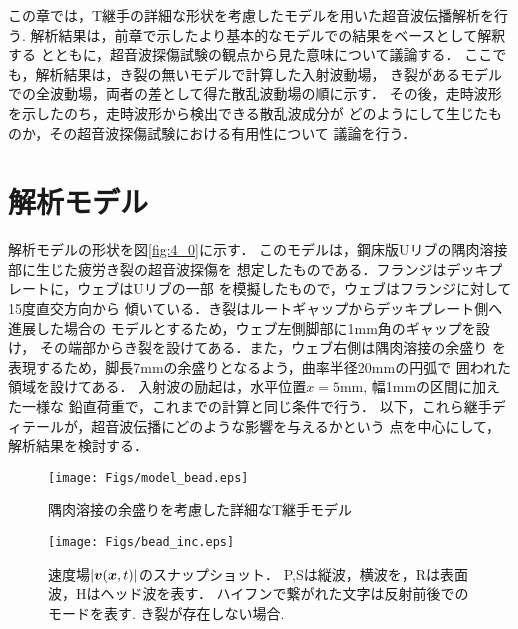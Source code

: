 この章では，T継手の詳細な形状を考慮したモデルを用いた超音波伝播解析を行う.
解析結果は，前章で示したより基本的なモデルでの結果をベースとして解釈する
とともに，超音波探傷試験の観点から見た意味について議論する．
ここでも，解析結果は，き裂の無いモデルで計算した入射波動場，
き裂があるモデルでの全波動場，両者の差として得た散乱波動場の順に示す．
その後，走時波形を示したのち，走時波形から検出できる散乱波成分が
どのようにして生じたものか，その超音波探傷試験における有用性について
議論を行う．
\section{解析モデル}
解析モデルの形状を図\ref{fig:4_0}に示す．
このモデルは，鋼床版Uリブの隅肉溶接部に生じた疲労き裂の超音波探傷を
想定したものである．フランジはデッキプレートに，ウェブはUリブの一部
を模擬したもので，ウェブはフランジに対して15度直交方向から
傾いている．き裂はルートギャップからデッキプレート側へ進展した場合の
モデルとするため，ウェブ左側脚部に1mm角のギャップを設け，
その端部からき裂を設けてある．また，ウェブ右側は隅肉溶接の余盛り
を表現するため，脚長7mmの余盛りとなるよう，曲率半径20mmの円弧で
囲われた領域を設けてある．
入射波の励起は，水平位置$x=5$mm, 幅1mmの区間に加えた一様な
鉛直荷重で，これまでの計算と同じ条件で行う．
以下，これら継手ディテールが，超音波伝播にどのような影響を与えるかという
点を中心にして，解析結果を検討する．
\begin{figure}[h]
	\begin{center}
	\texttt{[image: Figs/model\_bead.eps]} 
	\end{center}
	\caption{
		隅肉溶接の余盛りを考慮した詳細なT継手モデル
	} 
	\label{fig:fig4_0}
\end{figure}
\begin{figure}[h]
	\begin{center}
	\texttt{[image: Figs/bead\_inc.eps]} 
	\end{center}
	\caption{
		速度場$|\mbox{\boldmath $v$}(\mbox{\boldmath $x$},t)|$のスナップショット．
		P,Sは縦波，横波を，Rは表面波，Hはヘッド波を表す．
		ハイフンで繋がれた文字は反射前後でのモードを表す. き裂が存在しない場合.
	} 
	\label{fig:fig4_1}
\end{figure}
